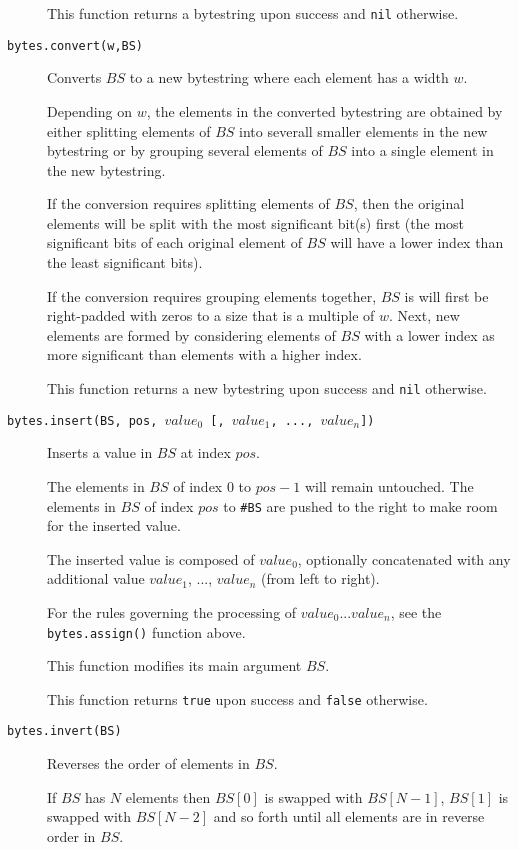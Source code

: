 \documentclass[11pt]{article}
\begin{document}
\begin{description}
{  This function returns a bytestring upon success and \texttt{nil} otherwise.
}

\item[\texttt{bytes.convert(w,BS)}]
{
  Converts $BS$ to a new bytestring where each element has a width $w$.

  Depending on $w$, the elements in the converted bytestring are obtained by either 
  splitting elements of $BS$ into severall smaller elements in the new bytestring or 
  by grouping several elements of $BS$ into a single element in the new bytestring.

  If the conversion requires splitting elements of $BS$, then the original elements will
  be split with the most significant bit(s) first (the most significant bits of each 
  original element of $BS$ will have a lower index than the least significant bits). 

  If the conversion requires grouping elements together, $BS$ is will first be 
  right-padded with zeros to a size that is a multiple of $w$. Next, new 
  elements are formed by considering elements of $BS$ with a lower index as more 
  significant than elements with a higher index.

  This function returns a new bytestring upon success and \texttt{nil} otherwise.
}

\item[\texttt{bytes.insert(BS, pos, $value_0$ [, $value_1$, ..., $value_n$])}]
{
  Inserts a value in $BS$ at index $pos$.

  The elements in $BS$ of index 0 to $pos-1$ will remain untouched.
  The elements in $BS$ of index $pos$ to \texttt{\#BS} are pushed to the right
  to make room for the inserted value.

  The inserted value is composed of $value_0$, optionally concatenated with
  any additional value $value_1$, ..., $value_n$ (from left to right).

  For the rules governing the processing of $value_0 ... value_n$, see
  the \texttt{bytes.assign()} function above.

  This function modifies its main argument $BS$.
  
  This function returns \texttt{true} upon success and \texttt{false} otherwise.
}

\item[\texttt{bytes.invert(BS)}]
{
  Reverses the order of elements in $BS$.

  If $BS$ has $N$ elements then $BS[0]$ is swapped with $BS[N-1]$,
  $BS[1]$ is swapped with $BS[N-2]$ and so forth until all elements are
  in reverse order in $BS$.

}
\end{description}
\end{document}

